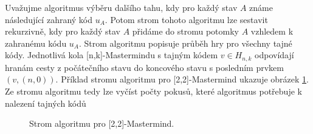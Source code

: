 

Uvažujme algoritmus výběru dalšího tahu, kdy pro každý stav $A$ známe následující zahraný kód $u_A$. Potom strom tohoto algoritmu lze sestavit rekurzivně, kdy pro každý stav $A$ přidáme do stromu potomky $A$ vzhledem k zahranému kódu $u_A$. Strom algoritmu popisuje průběh hry pro všechny tajné kódy. Jednotlivá kola [n,k]-Mastermindu s tajným kódem $v\in H_{n,k}$ odpovídají hranám cesty z počátečního stavu do koncového stavu s posledním prvkem $(v,(n,0))$. Příklad stromu algoritmu pro [2,2]-Mastermind ukazuje obrázek \ref{figprikladstromualgoritmu}. Ze stromu algoritmu tedy lze vyčíst počty pokusů, které algoritmus potřebuje k nalezení tajných kódů




\begin{figure}[h!]
    \centering
    \caption{Strom algoritmu pro [2,2]-Mastermind.}
\label{figprikladstromualgoritmu}
\end{figure}

